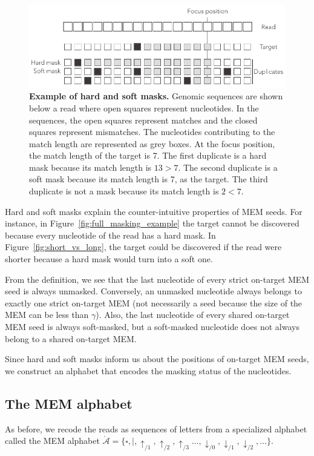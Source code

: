 \documentclass{article}
\begin{document}
\begin{figure}[h]
\centering
\includegraphics[scale=0.85]{hard_vs_soft_masks.pdf}
\caption{\textbf{Example of hard and soft masks.}
Genomic sequences are shown below a read where open squares represent
nucleotides. In the sequences, the open squares represent matches and the
closed squares represent mismatches. The nucleotides contributing to the
match length are represented as grey boxes. At the focus position, the
match length of the target is 7. The first duplicate is a hard mask
because its match length is $13>7$. The second duplicate is a soft mask
because its match length is 7, as the target. The third duplicate is not
a mask because its match length is $2<7$.}
\label{fig:hard_vs_soft_masks}
\end{figure}

Hard and soft masks explain the counter-intuitive properties of MEM seeds.
For instance, in Figure~\ref{fig:full_masking_example} the target cannot be
discovered because every nucleotide of the read has a hard mask. In
Figure~\ref{fig:short_vs_long}, the target could be discovered if the read
were shorter because a hard mask would turn into a soft one.

From the definition, we see that the last nucleotide of every strict
on-target MEM seed is always unmasked. Conversely, an unmasked nucleotide
always belongs to exactly one strict on-target MEM (not necessarily a seed
because the size of the MEM can be less than $\gamma$). Also, the last
nucleotide of every shared on-target MEM seed is always soft-masked, but a
soft-masked nucleotide does not always belong to a shared on-target MEM.

Since hard and soft masks inform us about the positions of on-target
MEM seeds, we construct an alphabet that encodes the masking status of the
nucleotides.

\subsection{The MEM alphabet}

As before, we recode the reads as sequences of letters from a specialized
alphabet called the MEM alphabet $\mathring{\mathcal{A}} = \{\square, |,
\uparrow_{/1}, \uparrow_{/2}, \uparrow_{/3} \ldots, \downarrow_{/0},
\downarrow_{/1}, \downarrow_{/2}, \ldots\}$.
\end{document}
